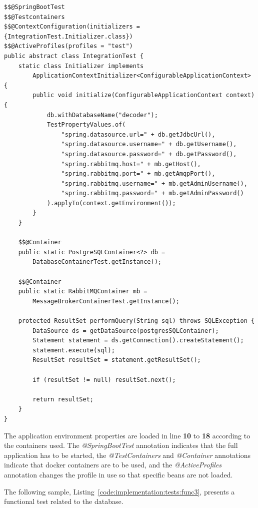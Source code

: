 \begin{lstlisting}[style=Java, caption=Functional Test - Foundation - \textbf{Data Decoder Master Backend} Setup, label={code:implementation:tests:func2}]
$$@SpringBootTest
$$@Testcontainers
$$@ContextConfiguration(initializers = {IntegrationTest.Initializer.class})
$$@ActiveProfiles(profiles = "test")
public abstract class IntegrationTest {
    static class Initializer implements
        ApplicationContextInitializer<ConfigurableApplicationContext> {
        public void initialize(ConfigurableApplicationContext context) {
            db.withDatabaseName("decoder");
            TestPropertyValues.of(
                "spring.datasource.url=" + db.getJdbcUrl(),
                "spring.datasource.username=" + db.getUsername(),
                "spring.datasource.password=" + db.getPassword(),
                "spring.rabbitmq.host=" + mb.getHost(),
                "spring.rabbitmq.port=" + mb.getAmqpPort(),
                "spring.rabbitmq.username=" + mb.getAdminUsername(),
                "spring.rabbitmq.password=" + mb.getAdminPassword()
            ).applyTo(context.getEnvironment());
        }
    }

    $$@Container
    public static PostgreSQLContainer<?> db =
        DatabaseContainerTest.getInstance();

    $$@Container
    public static RabbitMQContainer mb =
        MessageBrokerContainerTest.getInstance();

    protected ResultSet performQuery(String sql) throws SQLException {
        DataSource ds = getDataSource(postgresSQLContainer);
        Statement statement = ds.getConnection().createStatement();
        statement.execute(sql);
        ResultSet resultSet = statement.getResultSet();

        if (resultSet != null) resultSet.next();

        return resultSet;
    }
}
\end{lstlisting}

The application environment properties are loaded in line \textbf{10} to \textbf{18} according to the containers used. The \textit{@SpringBootTest} annotation indicates that the full application has to be started, the \textit{@TestContainers} and \textit{@Container} annotations indicate that docker containers are to be used, and the \textit{@ActiveProfiles} annotation changes the profile in use so that specific beans are not loaded.

The following sample, Listing~\ref{code:implementation:tests:func3}, presents a functional test related to the database.

